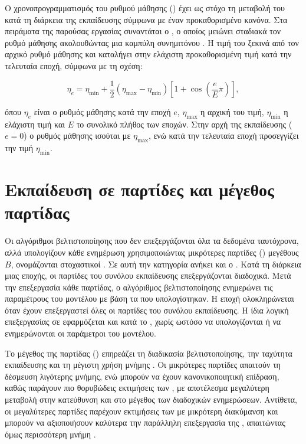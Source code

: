 Ο χρονοπρογραμματισμός του ρυθμού μάθησης ()
έχει ως στόχο τη μεταβολή του κατά τη διάρκεια της εκπαίδευσης σύμφωνα
με έναν προκαθορισμένο κανόνα. Στα πειράματα της παρούσας εργασίας
συναντάται ο  , ο οποίος
μειώνει σταδιακά τον ρυθμό μάθησης ακολουθώντας μια καμπύλη συνημιτόνου
\cite{loshchilov2017sgdr}. Η τιμή του ξεκινά από τον αρχικό ρυθμό μάθησης
και καταλήγει στην ελάχιστη προκαθορισμένη τιμή κατά την τελευταία εποχή,
σύμφωνα με τη σχέση:

\begin{equation}
    \eta_e
    =
    \eta_{\min}
    +
    \frac{1}{2}
    \left(
        \eta_{\max}-\eta_{\min}
    \right)
    \left[
        1+
        \cos\left(
            \frac{e}{E}\pi
        \right)
    \right],
    \label{eq:cosine-annealing}
\end{equation}

όπου \(\eta_e\) είναι ο ρυθμός μάθησης κατά την εποχή \(e\),
\(\eta_{\max}\) η αρχική του τιμή, \(\eta_{\min}\) η ελάχιστη τιμή και
\(E\) το συνολικό πλήθος των εποχών. Στην αρχή της εκπαίδευσης
(\(e=0\)) ο ρυθμός μάθησης ισούται με \(\eta_{\max}\), ενώ κατά την
τελευταία εποχή προσεγγίζει την τιμή \(\eta_{\min}\).


\section{Εκπαίδευση σε παρτίδες και μέγεθος παρτίδας}
\label{subsec:batch-size}

Οι αλγόριθμοι βελτιστοποίησης που δεν επεξεργάζονται όλα τα δεδομένα
ταυτόχρονα, αλλά υπολογίζουν κάθε ενημέρωση χρησιμοποιώντας μικρότερες
παρτίδες () μεγέθους \(B\), ονομάζονται στοχαστικοί \cite{goodfellow2016deep}. Σε
αυτή την κατηγορία ανήκει και ο .
Κατά τη διάρκεια μιας εποχής, οι παρτίδες του συνόλου εκπαίδευσης
επεξεργάζονται διαδοχικά. Μετά την επεξεργασία κάθε παρτίδας, ο
αλγόριθμος βελτιστοποίησης ενημερώνει τις παραμέτρους του μοντέλου με
βάση τα  που υπολογίστηκαν. Η εποχή ολοκληρώνεται όταν έχουν
επεξεργαστεί όλες οι παρτίδες του συνόλου εκπαίδευσης. Η ίδια λογική επεξεργασίας σε  εφαρμόζεται και κατά το
, χωρίς ωστόσο να υπολογίζονται  ή να
ενημερώνονται οι παράμετροι του μοντέλου.

Το μέγεθος της παρτίδας () επηρεάζει τη διαδικασία
βελτιστοποίησης, την ταχύτητα εκπαίδευσης και τη μέγιστη χρήση μνήμης
. Οι μικρότερες παρτίδες απαιτούν τη δέσμευση λιγότερης μνήμης,
ενώ μπορούν να έχουν κανονικοποιητική επίδραση,
καθώς παράγουν πιο θορυβώδεις εκτιμήσεις των , με αποτέλεσμα
μεγαλύτερη μεταβολή στην κατεύθυνση και στο μέγεθος των διαδοχικών
ενημερώσεων. Αντίθετα, οι μεγαλύτερες παρτίδες παρέχουν εκτιμήσεις των
 με μικρότερη διακύμανση και μπορούν να αξιοποιήσουν καλύτερα
την παράλληλη επεξεργασία της , απαιτώντας όμως περισσότερη
μνήμη \cite{goodfellow2016deep}.

